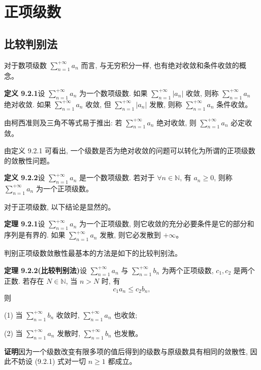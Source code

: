 \documentclass[UTF8, 12pt, fontset=fandol, oneside]{ctexart}
\begin{document}
\section{正项级数}

\subsection{比较判别法}

对于数项级数 $\sum\limits_{n=1}^{+\infty}a_n$ 而言, 与无穷积分一样, 也有绝对收敛和条件收敛的概念。

\noindent\textbf{定义 9.2.1}\quad 设 $\sum\limits_{n=1}^{+\infty}a_n$ 为一个数项级数. 如果 $\sum\limits_{n=1}^{+\infty}|a_n|$ 收敛, 则称 $\sum\limits_{n=1}^{+\infty}a_n$ 绝对收敛. 如果 $\sum\limits_{n=1}^{+\infty}a_n$ 收敛, 但 $\sum\limits_{n=1}^{+\infty}|a_n|$ 发散, 则称 $\sum\limits_{n=1}^{+\infty}a_n$ 条件收敛。

由柯西准则及三角不等式易于推出: 若 $\sum\limits_{n=1}^{+\infty}a_n$ 绝对收敛, 则 $\sum\limits_{n=1}^{+\infty}a_n$ 必定收敛。

由定义 9.2.1 可看出, 一个级数是否为绝对收敛的问题可以转化为所谓的正项级数的敛散性问题。

\noindent\textbf{定义 9.2.2}\quad 设 $\sum\limits_{n=1}^{+\infty}a_n$ 是一个数项级数. 若对于 $\forall n\in\mathbb N$, 有 $a_n\geq0$, 则称 $\sum\limits_{n=1}^{+\infty}a_n$ 为一个正项级数。

对于正项级数, 以下结论是显然的。

\noindent\textbf{定理 9.2.1}\quad 设 $\sum\limits_{n=1}^{+\infty}a_n$ 为一个正项级数, 则它收敛的充分必要条件是它的部分和序列是有界的. 如果 $\sum\limits_{n=1}^{+\infty}a_n$ 发散, 则它必发散到 $+\infty$。

判别正项级数敛散性最基本的方法是如下的比较判别法。

\noindent\textbf{定理 9.2.2(比较判别法)}\quad 设 $\sum\limits_{n=1}^{+\infty}a_n$ 与 $\sum\limits_{n=1}^{+\infty}b_n$ 为两个正项级数, $c_1,c_2$ 是两个正数. 若存在 $N\in\mathbb N$, 当 $n>N$ 时, 有
\begin{equation}
  c_1a_n\leq c_2b_n,
  \tag{9.2.1}
\end{equation}
则

(1) 当 $\sum\limits_{n=1}^{+\infty}b_n$ 收敛时, $\sum\limits_{n=1}^{+\infty}a_n$ 也收敛;

(2) 当 $\sum\limits_{n=1}^{+\infty}a_n$ 发散时, $\sum\limits_{n=1}^{+\infty}b_n$ 也发散。

\noindent\textbf{证明}\quad 因为一个级数改变有限多项的值后得到的级数与原级数具有相同的敛散性, 因此不妨设 (9.2.1) 式对一切 $n\geq1$ 都成立。
\end{document}
